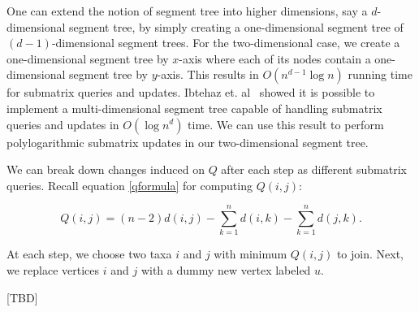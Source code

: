 One can extend the notion of segment tree into higher dimensions, say a $d$-dimensional segment tree, by simply creating a one-dimensional segment tree of $(d-1)$-dimensional segment trees.  For the two-dimensional case, we create a one-dimensional segment tree by $x$-axis where each of its nodes contain a one-dimensional segment tree by $y$-axis. This results in $O(n^{d-1}\log{n})$ running time for submatrix queries and updates. Ibtehaz et. al~\cite{ibtehaz2018multidimensional} showed it is possible to implement a multi-dimensional segment tree capable of handling submatrix queries and updates in $O(\log{n}^d)$ time. We can use this result to perform polylogarithmic submatrix updates in our two-dimensional segment tree.

We can break down changes induced on $Q$ after each step as different submatrix queries. Recall equation \ref{qformula} for computing $Q(i,j)$:


\[Q(i,j) = (n-2)d(i,j) -\sum_{k=1}^n d(i,k) - \sum_{k=1}^n d(j,k).\]


At each step, we choose two taxa $i$ and $j$ with minimum $Q(i, j)$ to join. Next, we replace vertices $i$ and $j$ with a dummy new vertex labeled $u$. 

[TBD]